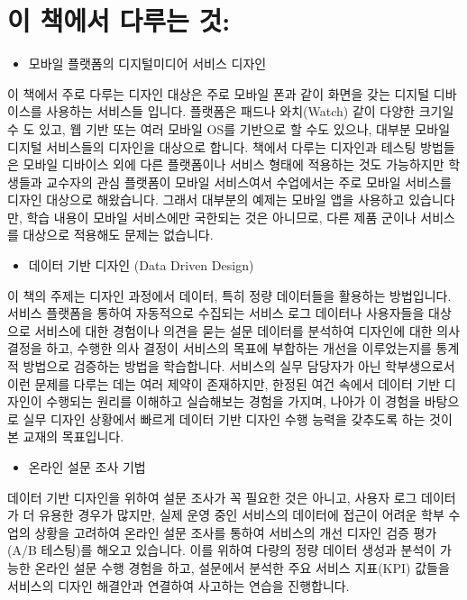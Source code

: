 \documentclass[
  letterpaper,
]{book}
\providecommand{\tightlist}{%
  \setlength{\itemsep}{0pt}\setlength{\parskip}{0pt}}\usepackage{longtable,booktabs,array}
\begin{document}
\section{이 책에서 다루는
것:}\label{uxc774-uxcc45uxc5d0uxc11c-uxb2e4uxb8e8uxb294-uxac83}

\begin{itemize}
\tightlist
\item
  모바일 플랫폼의 디지털미디어 서비스 디자인
\end{itemize}

이 책에서 주로 다루는 디자인 대상은 주로 모바일 폰과 같이 화면을 갖는
디지털 디바이스를 사용하는 서비스들 입니다. 플랫폼은 패드나 와치(Watch)
같이 다양한 크기일 수 도 있고, 웹 기반 또는 여러 모바일 OS를 기반으로 할
수도 있으나, 대부분 모바일 디지털 서비스들의 디자인을 대상으로 합니다.
책에서 다루는 디자인과 테스팅 방법들은 모바일 디바이스 외에 다른
플랫폼이나 서비스 형태에 적용하는 것도 가능하지만 학생들과 교수자의 관심
플랫폼이 모바일 서비스여서 수업에서는 주로 모바일 서비스를 디자인
대상으로 해왔습니다. 그래서 대부분의 예제는 모바일 앱을 사용하고
있습니다만, 학습 내용이 모바일 서비스에만 국한되는 것은 아니므로, 다른
제품 군이나 서비스를 대상으로 적용해도 문제는 없습니다.

\begin{itemize}
\tightlist
\item
  데이터 기반 디자인 (Data Driven Design)
\end{itemize}

이 책의 주제는 디자인 과정에서 데이터, 특히 정량 데이터들을 활용하는
방법입니다. 서비스 플랫폼을 통하여 자동적으로 수집되는 서비스 로그
데이터나 사용자들을 대상으로 서비스에 대한 경험이나 의견을 묻는 설문
데이터를 분석하여 디자인에 대한 의사 결정을 하고, 수행한 의사 결정이
서비스의 목표에 부합하는 개선을 이루었는지를 통계적 방법으로 검증하는
방법을 학습합니다. 서비스의 실무 담당자가 아닌 학부생으로서 이런 문제를
다루는 데는 여러 제약이 존재하지만, 한정된 여건 속에서 데이터 기반
디자인이 수행되는 원리를 이해하고 실습해보는 경험을 가지며, 나아가 이
경험을 바탕으로 실무 디자인 상황에서 빠르게 데이터 기반 디자인 수행
능력을 갖추도록 하는 것이 본 교재의 목표입니다.

\begin{itemize}
\tightlist
\item
  온라인 설문 조사 기법
\end{itemize}

데이터 기반 디자인을 위하여 설문 조사가 꼭 필요한 것은 아니고, 사용자
로그 데이터가 더 유용한 경우가 많지만, 실제 운영 중인 서비스의 데이터에
접근이 어려운 학부 수업의 상황을 고려하여 온라인 설문 조사를 통하여
서비스의 개선 디자인 검증 평가(A/B 테스팅)를 해오고 있습니다. 이를
위하여 다량의 정량 데이터 생성과 분석이 가능한 온라인 설문 수행 경험을
하고, 설문에서 분석한 주요 서비스 지표(KPI) 값들을 서비스의 디자인
해결안과 연결하여 사고하는 연습을 진행합니다.
\end{document}
